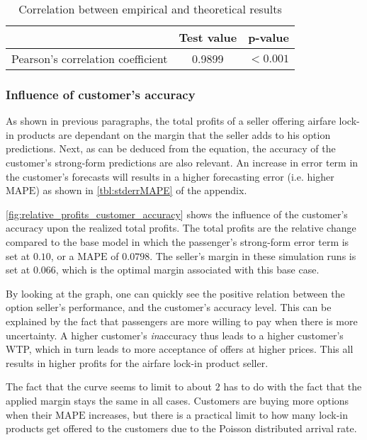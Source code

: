 \begin{table}
\centering
\begin{tabular}{l c c}
\toprule
~  &  Test value  &  p-value  \\
\midrule
Pearson's correlation coefficient   &  0.9899  &  $< 0.001$ \\
\bottomrule
\end{tabular}
\caption{Correlation between empirical and theoretical results}
\label{tbl:pearson_theory_empirical}
\end{table}



\subsubsection{Influence of customer's accuracy}
As shown in previous paragraphs, the total profits of a seller offering airfare lock-in products are dependant on the margin that the seller adds to his option predictions. Next, as can be deduced from the equation, the accuracy of the customer's strong-form predictions are also relevant. An increase in error term in the customer's forecasts will results in a higher forecasting error (i.e. higher $\mbox{MAPE}$) as shown in \autoref{tbl:stderrMAPE} of the appendix.

\autoref{fig:relative_profits_customer_accuracy} shows the influence of the customer's accuracy upon the realized total profits. The total profits are the relative change compared to the base model in which the passenger's strong-form error term is set at $0.10$, or a $\mbox{MAPE}$ of $0.0798$. The seller's margin in these simulation runs is set at $0.066$, which is the optimal margin associated with this base case.


By looking at the graph, one can quickly see the positive relation between the option seller's performance, and the customer's accuracy level. This can be explained by the fact that passengers are more willing to pay when there is more uncertainty. A higher customer's \emph{in}accuracy thus leads to a higher customer's WTP, which in turn leads to more acceptance of offers at higher prices. This all results in higher profits for the airfare lock-in product seller.

The fact that the curve seems to limit to about $2$ has to do with the fact that the applied margin stays the same in all cases. Customers are buying more options when their $\mbox{MAPE}$ increases, but there is a practical limit to how many lock-in products get offered to the customers due to the Poisson distributed arrival rate.

